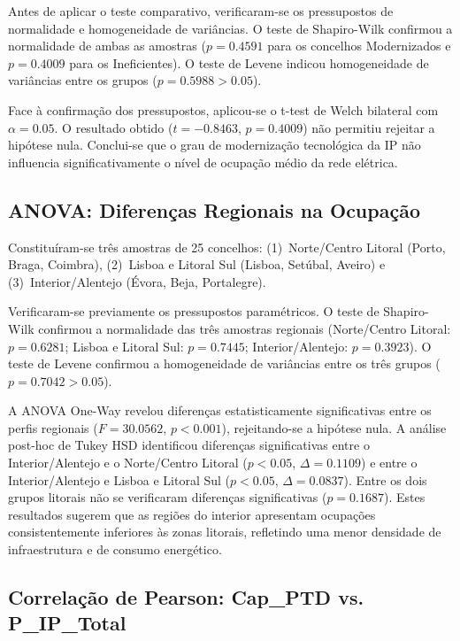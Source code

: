 \documentclass[conference]{IEEEtran}
\begin{document}
Antes de aplicar o teste comparativo, verificaram-se os pressupostos de normalidade e homogeneidade de variâncias. O teste de Shapiro-Wilk confirmou a normalidade de ambas as amostras ($p = 0.4591$ para os concelhos Modernizados e $p = 0.4009$ para os Ineficientes). O teste de Levene indicou homogeneidade de variâncias entre os grupos ($p = 0.5988 > 0.05$).

Face à confirmação dos pressupostos, aplicou-se o t-test de 
Welch bilateral com $\alpha = 0.05$. O resultado obtido 
($t = -0.8463$, $p = 0.4009$) não permitiu rejeitar a 
hipótese nula. Conclui-se que o grau de modernização 
tecnológica da IP não influencia significativamente 
o nível de ocupação médio da rede elétrica.

\subsection{ANOVA: Diferenças Regionais na Ocupação}

Constituíram-se três amostras de 25 concelhos: (1)~Norte/Centro Litoral (Porto, Braga, Coimbra), (2)~Lisboa e Litoral Sul (Lisboa, Setúbal, Aveiro) e (3)~Interior/Alentejo (Évora, Beja, Portalegre).

Verificaram-se previamente os pressupostos paramétricos. O teste de Shapiro-Wilk confirmou a normalidade das três amostras regionais (Norte/Centro Litoral: $p = 0.6281$; Lisboa e Litoral Sul: $p = 0.7445$; Interior/Alentejo: $p = 0.3923$). O teste de Levene confirmou a homogeneidade de variâncias entre os três grupos ($p = 0.7042 > 0.05$).

A ANOVA One-Way revelou diferenças estatisticamente 
significativas entre os perfis regionais 
($F = 30.0562$, $p < 0.001$), rejeitando-se a hipótese 
nula. A análise post-hoc de Tukey HSD identificou 
diferenças significativas entre o Interior/Alentejo 
e o Norte/Centro Litoral ($p < 0.05$, $\Delta = 0.1109$) 
e entre o Interior/Alentejo e Lisboa e Litoral Sul 
($p < 0.05$, $\Delta = 0.0837$). Entre os dois grupos 
litorais não se verificaram diferenças significativas 
($p = 0.1687$). Estes resultados sugerem que as regiões 
do interior apresentam ocupações consistentemente 
inferiores às zonas litorais, refletindo uma menor 
densidade de infraestrutura e de consumo energético.

\subsection{Correlação de Pearson: Cap\_PTD vs. P\_IP\_Total}
\end{document}
